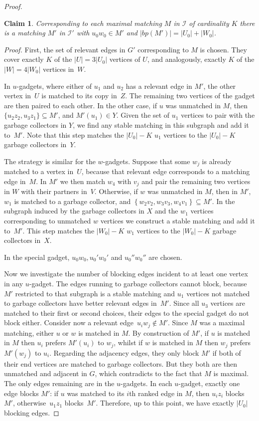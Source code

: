 \documentclass[preprint,12pt]{elsarticle}
\newcommand{\myproof}{\noindent\textit{Proof. }}
\newtheorem{claim}[theorem]{Claim}
\begin{document}
\begin{proof}
	\begin{claim}
		Corresponding to each maximal matching $M$ in $\mathcal{I}$ of cardinality $K$ there is a matching $M'$ in $\mathcal{I'}$ with $u_0w_0 \in M'$ and $|bp(M')| = |U_0| + |W_0|$.
	\end{claim}
		\myproof First, the set of relevant edges in $G'$ corresponding to $M$ is chosen. They cover exactly $K$ of the $|U| = 3 |U_0|$ vertices of $U$, and analogously, exactly $K$ of the $|W| = 4 |W_0|$ vertices in~$W$.
		
		In $u$-gadgets, where either of $u_1$ and $u_2$ has a relevant edge in $M'$, the other vertex in~$U$ is matched to its copy in~$Z$. The remaining two vertices of the gadget are then paired to each other. In the other case, if $u$ was unmatched in $M$, then $\{u_2z_2,u_3 z_1\}\subseteq M'$, and $M'(u_1) \in Y$. Given the set of $u_1$ vertices to pair with the garbage collectors in $Y$, we find any stable matching in this subgraph and add it to~$M'$. Note that this step matches the $|U_0| - K$ $u_1$ vertices to the $|U_0| - K$ garbage collectors in~$Y$.
		
		The strategy is similar for the $w$-gadgets.  Suppose that some $w_j$ is already matched to a vertex in~$U$, because that relevant edge corresponds to a matching edge in~$M$. In $M'$ we then match $w_4$ with $v_j$ and pair the remaining two vertices in $W$ with their partners in~$V$. Otherwise, if $w$ was unmatched in $M$, then in $M'$, $w_1$ is matched to a garbage collector, and $\left\{ w_2v_2, w_3v_3, w_4v_1 \right\} \subseteq M'$. In the subgraph induced by the garbage collectors in $X$ and the $w_1$ vertices corresponding to unmatched $w$ vertices we construct a stable matching and add it to~$M'$. This step matches the $|W_0| - K$ $w_1$ vertices to the $|W_0| - K$ garbage collectors in~$X$.
		
		In the special gadget, $u_0 w_0, u_0'w_0'$ and $u_0''w_0''$ are chosen.
		
		Now we investigate the number of blocking edges incident to at least one vertex in any $u$-gadget. The edges running to garbage collectors cannot block, because $M'$ restricted to that subgraph is a stable matching and $u_1$ vertices not matched to garbage collectors have better relevant edges in~$M'$. Since all $u_3$ vertices are matched to their first or second choices, their edges to the special gadget do not block either. Consider now a relevant edge~$u_i w_j\notin M'$. Since $M$ was a maximal matching, either $u$ or $w$ is matched in $M$.  By construction of $M'$, if $u$ is matched in $M$ then $u_i$ prefers $M'(u_i)$ to $w_j$, whilst if $w$ is matched in $M$ then $w_j$ prefers $M'(w_j)$ to $u_i$. Regarding the adjacency edges, they only block $M'$ if both of their end vertices are matched to garbage collectors. But they both are then unmatched and adjacent in $G$, which contradicts to the fact that $M$ is maximal. The only edges remaining are in the $u$-gadgets. In each $u$-gadget, exactly one edge blocks $M'$: if $u$ was matched to its $i$th ranked edge in $M$, then $u_i z_i$ blocks $M'$, otherwise~$u_1 z_1$ blocks~$M'$.  Therefore, up to this point, we have exactly $|U_0|$ blocking edges.
		

\end{proof}
\end{document}
